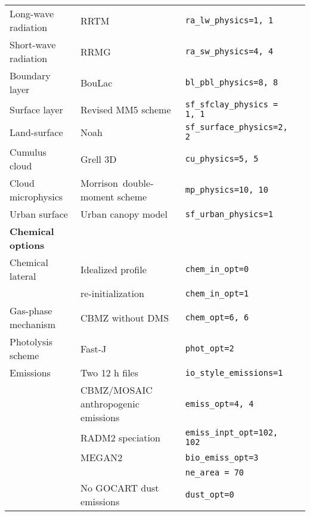 \begin{ThreePartTable}
\begin{longtable}[c]{l p{}l l}
Long-wave radiation & RRTM & \verb|ra_lw_physics=1, 1|\\
Short-wave radiation & RRMG & \verb|ra_sw_physics=4, 4|\\
Boundary layer & BouLac & \verb|bl_pbl_physics=8, 8|\\
Surface layer & Revised MM5 scheme & \verb|sf_sfclay_physics = 1, 1|\\
Land-surface & Noah & \verb|sf_surface_physics=2, 2|\\
Cumulus cloud & Grell 3D & \verb|cu_physics=5, 5|\\
Cloud microphysics & Morrison~double-moment scheme & \verb|mp_physics=10, 10|\\
Urban surface & Urban canopy model & \verb|sf_urban_physics=1|\\
{\bf Chemical options}\\
Chemical lateral & Idealized profile  & \verb|chem_in_opt=0|\\
 & re-initialization & \verb|chem_in_opt=1|\\
Gas-phase mechanism & CBMZ without DMS & \verb|chem_opt=6, 6|\\
Photolysis scheme & Fast-J & \verb|phot_opt=2|\\
Emissions & Two 12 h files & \verb|io_style_emissions=1|\\
 & CBMZ/MOSAIC anthropogenic emissions & \verb|emiss_opt=4, 4|\\
 & RADM2 speciation & \verb|emiss_inpt_opt=102, 102|\\
 & MEGAN2 & \verb|bio_emiss_opt=3|\\
 &  & \verb|ne_area = 70|\\
 & No GOCART dust emissions & \verb|dust_opt=0|\\
 \hline
\end{longtable}
\end{ThreePartTable}
